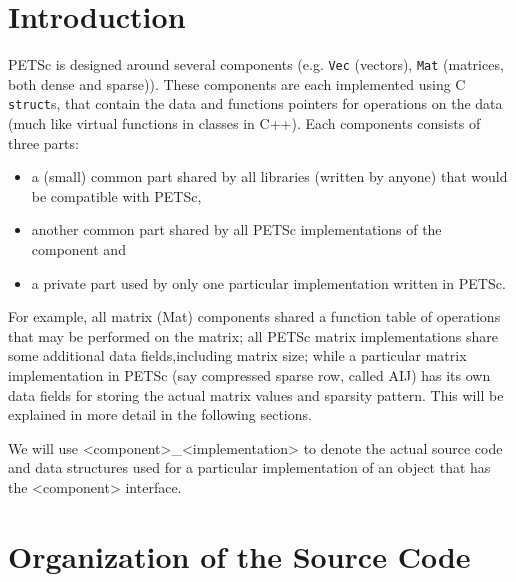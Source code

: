 \section{Introduction}

PETSc is designed around several components (e.g. {\tt Vec} (vectors),
{\tt Mat} (matrices, both dense and sparse)). These components are each 
implemented using C {\tt struct}s, that contain the data and functions pointers
for operations on the data (much like virtual functions in classes in C++). 
Each components consists of three parts: 
\begin{itemize}
\item a (small) common part shared by all libraries (written by anyone) that would be 
      compatible with PETSc,
\item another common part shared by all PETSc implementations of the component and
\item a private part used by only one particular implementation written in PETSc.
\end{itemize}
For example, all matrix (Mat) components shared a function table of operations that 
may be performed on the matrix; all PETSc matrix implementations share some additional
data fields,including matrix size; while a particular matrix implementation in PETSc
(say compressed sparse row, called AIJ) has its own data fields for storing the actual
matrix values and sparsity pattern. This will be explained in more detail in the following sections.

We will use <component>\_<implementation> to denote the actual source code and 
data structures used for a particular implementation of an object that has the 
<component> interface.

\section{Organization of the Source Code}

